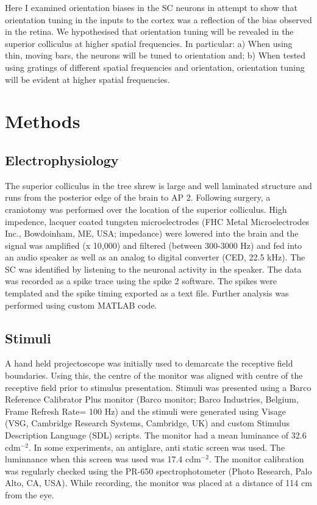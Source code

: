 	Here I examined orientation biases in the SC neurons in attempt to show that orientation tuning in the inputs to the cortex was a reflection of the bias observed in the retina. We hypothesised that orientation tuning will be revealed in the superior colliculus at higher spatial frequencies. In particular:
	a) When using thin, moving bars, the neurons will be tuned to orientation and;
	b) When tested using gratings of different spatial frequencies and orientation, orientation tuning will be evident at higher spatial frequencies.
	
	
	
	
	\section{Methods}
	\subsection{Electrophysiology}
	The superior colliculus in the tree shrew is large and well laminated structure and runs from the posterior edge of the brain to AP 2. Following surgery, a craniotomy was performed over the location of the superior colliculus. High impedence, lacquer coated tungsten microelectrodes (FHC Metal Microelectrodes Inc., Bowdoinham, ME, USA; impedance) were lowered into the brain and the signal was amplified (x 10,000) and filtered (between 300-3000 Hz) and fed into an audio speaker as well as an analog to digital converter (CED, 22.5 kHz). The SC was identified by listening to the neuronal activity in the speaker. The data was recorded as a spike trace using the spike 2 software. The spikes were templated and the spike timing exported as a text file. Further analysis was performed using custom MATLAB code.
	
	\subsection{Stimuli}
	
	A hand held projectoscope was initially used to demarcate the receptive field boundaries. Using this, the centre of the monitor was aligned with centre of the receptive field prior to stimulus presentation. Stimuli was presented using a Barco Reference Calibrator Plus monitor (Barco monitor; Barco Industries, Belgium, Frame Refresh Rate= 100 Hz) and the stimuli were generated using Visage (VSG, Cambridge Research Systems, Cambridge, UK) and custom Stimulus Description Language (SDL) scripts. The monitor had a mean luminance of 32.6 cdm$^{-2}$. In some experiments, an antiglare, anti static screen was used. The luminnance when this screen was used was 17.4 cdm$^{-2}$. The monitor calibration was regularly checked using the PR-650 spectrophotometer (Photo Research, Palo Alto, CA, USA). While recording, the monitor was placed at a distance of 114 cm from the eye.
	
